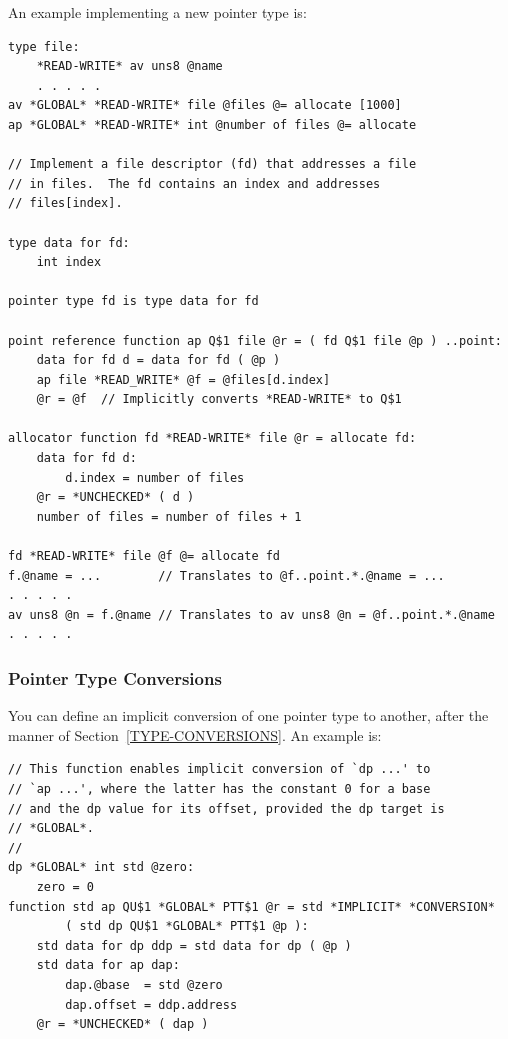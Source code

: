\documentclass[12pt]{article}
\newenvironment{indpar}[1][0.3in]%
	{\begin{list}{}%
		     {\setlength{\itemsep}{0in}%
		      \setlength{\topsep}{0in}%
		      \setlength{\parsep}{1ex}%
		      \setlength{\labelwidth}{#1}%
		      \setlength{\leftmargin}{#1}%
		      \addtolength{\leftmargin}{\labelsep}}%
	 \item}%
	{\end{list}}
\begin{document}
An example implementing a new pointer type is:

\begin{indpar}\begin{verbatim}
type file:
    *READ-WRITE* av uns8 @name
    . . . . .
av *GLOBAL* *READ-WRITE* file @files @= allocate [1000]
ap *GLOBAL* *READ-WRITE* int @number of files @= allocate

// Implement a file descriptor (fd) that addresses a file
// in files.  The fd contains an index and addresses
// files[index].

type data for fd:
    int index

pointer type fd is type data for fd

point reference function ap Q$1 file @r = ( fd Q$1 file @p ) ..point:
    data for fd d = data for fd ( @p )
    ap file *READ_WRITE* @f = @files[d.index]
    @r = @f  // Implicitly converts *READ-WRITE* to Q$1

allocator function fd *READ-WRITE* file @r = allocate fd:
    data for fd d:
        d.index = number of files
    @r = *UNCHECKED* ( d )
    number of files = number of files + 1

fd *READ-WRITE* file @f @= allocate fd
f.@name = ...        // Translates to @f..point.*.@name = ...
. . . . .
av uns8 @n = f.@name // Translates to av uns8 @n = @f..point.*.@name
. . . . .
\end{verbatim}\end{indpar}

\subsubsection{Pointer Type Conversions}
\label{POINTER-TYPE-CONVERSIONS}

You can define an implicit conversion of one pointer type
to another, after the manner of Section~\ref{TYPE-CONVERSIONS}.
An example is:

\begin{indpar}\begin{verbatim}
// This function enables implicit conversion of `dp ...' to
// `ap ...', where the latter has the constant 0 for a base
// and the dp value for its offset, provided the dp target is
// *GLOBAL*.
//
dp *GLOBAL* int std @zero:
    zero = 0
function std ap QU$1 *GLOBAL* PTT$1 @r = std *IMPLICIT* *CONVERSION*
        ( std dp QU$1 *GLOBAL* PTT$1 @p ):
    std data for dp ddp = std data for dp ( @p )
    std data for ap dap:
        dap.@base  = std @zero
        dap.offset = ddp.address
    @r = *UNCHECKED* ( dap )
\end{verbatim}\end{indpar}
\end{document}

